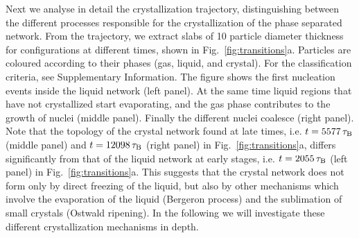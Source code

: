 \documentclass[preprint,amsmath,amssymb,superscriptaddress]{revtex4-1}
\begin{document}
Next we analyse in detail the crystallization trajectory, distinguishing between the different processes responsible for the
crystallization of the phase separated network.
From the trajectory, we extract slabs of 10 particle diameter thickness for configurations at different times, shown in Fig.~\ref{fig:transitions}a. 
Particles are coloured according to their phases (gas, liquid, and crystal). For the classification criteria, see Supplementary Information. The figure shows the first nucleation 
events inside the liquid network (left panel). At the same time liquid regions that have not crystallized start evaporating, and the gas phase contributes to the growth of nuclei (middle panel). Finally the different nuclei coalesce (right panel). 
Note that the topology of the crystal network found at late times, i.e. $t=5577\,\tau_{\rm B}$ (middle panel) and $t=12098\,\tau_{\rm B}$ (right panel) in Fig.~\ref{fig:transitions}a, differs significantly from that of the liquid network at early stages, i.e. $t=2055\,\tau_{\rm B}$ (left panel) in Fig.~\ref{fig:transitions}a. This suggests that the crystal network does not form only by direct freezing of the liquid, but also by other mechanisms which involve the evaporation of the liquid (Bergeron process) and the sublimation of small crystals (Ostwald ripening). In the following we will investigate these different crystallization mechanisms in depth.
 
\end{document}
